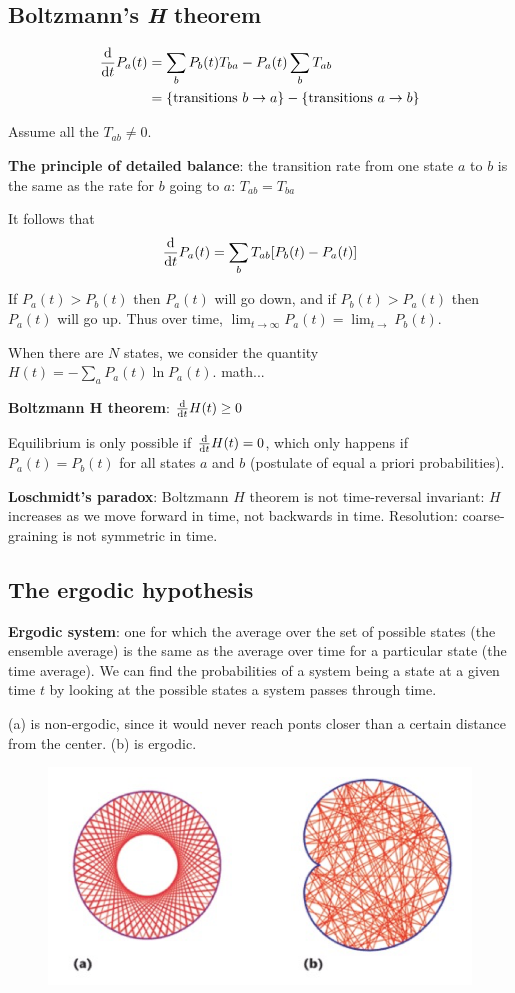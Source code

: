 \subsection{Boltzmann's \textit{H} theorem}

\begin{align*}
    \dv{}{t}P_a(t) &= \sum_b P_b(t) T_{ba} - P_a(t) \sum_b T_{ab} \\
    &= \{\text{transitions } b \rightarrow a\} - \{\text{transitions } a \rightarrow b\}
\end{align*}

Assume all the $T_{ab} \neq 0$.

\textbf{The principle of detailed balance}: the transition rate from one state $a$ to $b$ is the same as the rate for $b$ going to $a$: $T_{ab} = T_{ba}$

It follows that $$\dv{}{t} P_a(t) = \sum_b T_{ab} [P_b(t) - P_a(t)]$$

If $P_a(t) > P_b(t)$ then $P_a(t)$ will go down, and if $P_b(t) > P_a(t)$ then $P_a(t)$ will go up. Thus over time, $\lim_{t \rightarrow \infty} P_a(t) = \lim_{t \rightarrow} P_b(t)$.

When there are $N$ states, we consider the quantity $H (t) = -\sum_a P_a(t) \ln P_a(t)$. math...

\textbf{Boltzmann H theorem}: $\dv{}{t} H(t) \geq 0$

Equilibrium is only possible if $\dv{}{t} H(t) = 0$, which only happens if $P_a(t) = P_b(t)$ for all states $a$ and $b$ (postulate of equal a priori probabilities).

\textbf{Loschmidt's paradox}: Boltzmann $H$ theorem is not time-reversal invariant: $H$ increases as we move forward in time, not backwards in time. Resolution: coarse-graining is not symmetric in time.

\subsection{The ergodic hypothesis}

\textbf{Ergodic system}: one for which the average over the set of possible states (the ensemble average) is the same as the average over time for a particular state (the time average). We can find the probabilities of a system being a state at a given time $t$ by looking at the possible states a system passes through time.

(a) is non-ergodic, since it would never reach ponts closer than a certain distance from the center. (b) is ergodic.
\begin{figure}[h]
    \centering
    \includegraphics[width=0.8\linewidth]{figures/03_06.png}
\end{figure}

